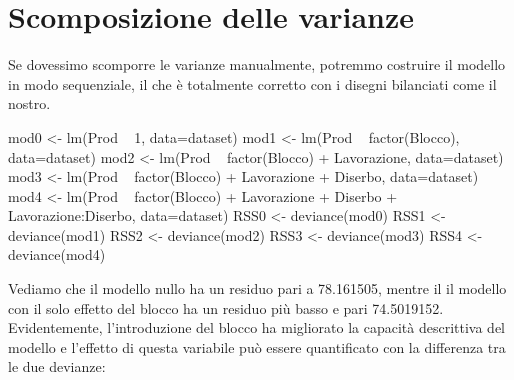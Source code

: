 \documentclass[a4paper,12pt,oneside]{book}
\newenvironment{Shaded}{}{}
\newcommand{\KeywordTok}[1]{#1}
\newcommand{\DataTypeTok}[1]{#1}
\newcommand{\DecValTok}[1]{#1}
\newcommand{\StringTok}[1]{#1}
\newcommand{\OperatorTok}[1]{#1}
\newcommand{\NormalTok}[1]{#1}
\begin{document}
\hypertarget{scomposizione-delle-varianze}{%
\section{Scomposizione delle varianze}\label{scomposizione-delle-varianze}}

Se dovessimo scomporre le varianze manualmente, potremmo costruire il modello in modo sequenziale, il che è totalmente corretto con i disegni bilanciati come il nostro.

\begin{Shaded}
\begin{Highlighting}[]
\NormalTok{mod0 <-}\StringTok{ }\KeywordTok{lm}\NormalTok{(Prod }\OperatorTok{~}\StringTok{ }\DecValTok{1}\NormalTok{, }\DataTypeTok{data=}\NormalTok{dataset)}
\NormalTok{mod1 <-}\StringTok{ }\KeywordTok{lm}\NormalTok{(Prod }\OperatorTok{~}\StringTok{ }\KeywordTok{factor}\NormalTok{(Blocco), }\DataTypeTok{data=}\NormalTok{dataset)}
\NormalTok{mod2 <-}\StringTok{ }\KeywordTok{lm}\NormalTok{(Prod }\OperatorTok{~}\StringTok{ }\KeywordTok{factor}\NormalTok{(Blocco) }\OperatorTok{+}\StringTok{ }\NormalTok{Lavorazione, }\DataTypeTok{data=}\NormalTok{dataset)}
\NormalTok{mod3 <-}\StringTok{ }\KeywordTok{lm}\NormalTok{(Prod }\OperatorTok{~}\StringTok{ }\KeywordTok{factor}\NormalTok{(Blocco) }\OperatorTok{+}\StringTok{ }\NormalTok{Lavorazione }\OperatorTok{+}\StringTok{ }\NormalTok{Diserbo, }
            \DataTypeTok{data=}\NormalTok{dataset)}
\NormalTok{mod4 <-}\StringTok{ }\KeywordTok{lm}\NormalTok{(Prod }\OperatorTok{~}\StringTok{ }\KeywordTok{factor}\NormalTok{(Blocco) }\OperatorTok{+}\StringTok{ }\NormalTok{Lavorazione }\OperatorTok{+}\StringTok{ }\NormalTok{Diserbo }\OperatorTok{+}
\StringTok{            }\NormalTok{Lavorazione}\OperatorTok{:}\NormalTok{Diserbo, }\DataTypeTok{data=}\NormalTok{dataset)}
\NormalTok{RSS0 <-}\StringTok{ }\KeywordTok{deviance}\NormalTok{(mod0)}
\NormalTok{RSS1 <-}\StringTok{ }\KeywordTok{deviance}\NormalTok{(mod1)}
\NormalTok{RSS2 <-}\StringTok{ }\KeywordTok{deviance}\NormalTok{(mod2)}
\NormalTok{RSS3 <-}\StringTok{ }\KeywordTok{deviance}\NormalTok{(mod3)}
\NormalTok{RSS4 <-}\StringTok{ }\KeywordTok{deviance}\NormalTok{(mod4)}
\end{Highlighting}
\end{Shaded}

Vediamo che il modello nullo ha un residuo pari a 78.161505, mentre il il modello con il solo effetto del blocco ha un residuo più basso e pari 74.5019152. Evidentemente, l'introduzione del blocco ha migliorato la capacità descrittiva del modello e l'effetto di questa variabile può essere quantificato con la differenza tra le due devianze:
\end{document}
